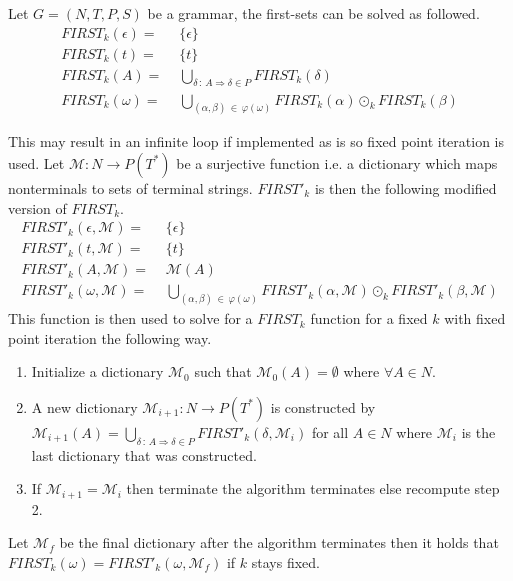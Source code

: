 \begin{algorithm}
    Let $G = (N, T, P, S)$ be a grammar, the first-sets can be solved as followed.
    \begin{align*}
        FIRST_k(\epsilon) =&\,\, \{\epsilon\} \\
        FIRST_k(t) =&\,\, \{t\} \\
        FIRST_k(A) =&\,\, \bigcup_{\delta \, : \, A \Rightarrow \delta \in P} FIRST_k(\delta) \\
        FIRST_k(\omega) =&\,\, \bigcup_{(\alpha, \beta) \, \in \, \varphi(\omega)} FIRST_k(\alpha) \odot_k FIRST_k(\beta)
    \end{align*}
\end{algorithm}
\noindent This may result in an infinite loop if implemented as is so fixed point iteration is used. Let $\mathcal{M}: N \to P(T^*)$ be a surjective function i.e. a dictionary which maps nonterminals to sets of terminal strings. $FIRST'_k$ is then the following modified version of $FIRST_k$.
\begin{align*}
    FIRST'_k(\epsilon, \mathcal{M}) =&\,\, \{\epsilon\} \\
    FIRST'_k(t, \mathcal{M}) =&\,\, \{t\} \\
    FIRST'_k(A, \mathcal{M}) =&\,\, \mathcal{M}(A) \\
    FIRST'_k(\omega, \mathcal{M}) =&\,\, \bigcup_{(\alpha, \beta) \, \in \, \varphi(\omega)} FIRST'_k(\alpha, \mathcal{M}) \odot_k FIRST'_k(\beta, \mathcal{M})
\end{align*}
This function is then used to solve for a $FIRST_k$ function for a fixed $k$ with fixed point iteration the following way.
\begin{enumerate}
    \item Initialize a dictionary $\mathcal{M}_0$ such that $\mathcal{M}_0(A) = \emptyset$ where $\forall A \in N$.
    \item A new dictionary $\mathcal{M}_{i+1}: N \to P(T^*)$ is constructed by $\mathcal{M}_{i+1}(A) = \bigcup_{\delta \, : \, A \Rightarrow \delta \in P} FIRST'_k(\delta, \mathcal{M}_{i})$ for all $A \in N$ where $\mathcal{M}_{i}$ is the last dictionary that was constructed.
    \item If $\mathcal{M}_{i + 1} = \mathcal{M}_{i}$ then terminate the algorithm terminates else recompute step 2.
\end{enumerate}
Let $\mathcal{M}_f$ be the final dictionary after the algorithm terminates then it holds that $FIRST_k(\omega) = FIRST'_k(\omega, \mathcal{M}_f)$ if $k$ stays fixed.
